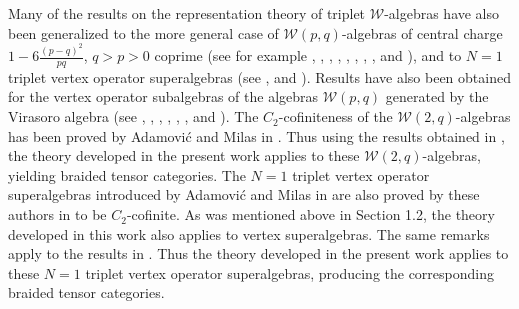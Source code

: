 \documentclass[12pt]{article}
\begin{document}
Many of the results on the representation theory of triplet
$\mathcal{W}$-algebras have also been generalized to the more general
case of $\mathcal{W}(p, q)$-algebras \cite{FGST2} of central charge
$1-6\frac{(p-q)^{2}}{pq}$, $q>p>0$ coprime (see for example
\cite{AM1}, \cite{S}, \cite{RP2}, \cite{Ra1}, \cite{Ra2},
\cite{Ra3}, \cite{Ra5}, \cite{GRW}, \cite{AM6} and \cite{Wo}), and to
$N=1$ triplet vertex operator superalgebras (see \cite{AM3},
\cite{AM5} and \cite{AM7}).  
Results have also been obtained for the vertex operator subalgebras of
the algebras $\mathcal{W}(p,q)$ generated by the Virasoro algebra (see
\cite{GK2}, \cite{EF}, \cite{PRZ}, \cite{ReS}, \cite{MR}, \cite{RP},
\cite{BFGT} and \cite{GV}).  The $C_{2}$-cofiniteness of the
$\mathcal{W}(2, q)$-algebras has been proved by Adamovi\'{c} and Milas
in \cite{AM6}. Thus using the results obtained in \cite{H14}, the
theory developed in the present work applies to these $\mathcal{W}(2,
q)$-algebras, yielding braided tensor categories.  The $N=1$ triplet
vertex operator superalgebras introduced by Adamovi\'{c} and Milas in
\cite{AM3} are also proved by these authors in \cite{AM5} to be
$C_{2}$-cofinite. As was mentioned above in Section 1.2, the theory
developed in this work also applies to vertex superalgebras.  The same
remarks apply to the results in \cite{H14}.  Thus the theory developed
in the present work applies to these $N=1$ triplet vertex operator
superalgebras, producing the corresponding braided tensor categories.
\end{document}
